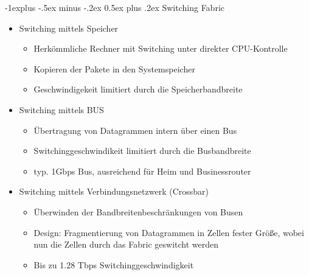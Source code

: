\documentclass[10pt,landscape]{article}
\makeatletter
\renewcommand{\subsection}{\@startsection{subsection}{2}{0mm}%
                                {-1explus -.5ex minus -.2ex}%
                                {0.5ex plus .2ex}%
                                {\normalfont\normalsize\bfseries}}
\makeatother
\begin{document}
\begin{multicols}{3}
\subsection{Switching Fabric}
\begin{itemize}
    \item Switching mittels Speicher
    \begin{itemize}
        \item Herkömmliche Rechner mit Switching unter direkter CPU-Kontrolle
        \item Kopieren der Pakete in den Systemspeicher
        \item Geschwindigekeit limitiert durch die Speicherbandbreite
    \end{itemize}
    \item Switching mittels BUS
    \begin{itemize}
        \item Übertragung von Datagrammen intern über einen Bus
        \item Switchinggeschwindikeit limitiert durch die Busbandbreite
        \item typ. 1Gbps Bus, ausreichend für Heim und Businessrouter
    \end{itemize}
    \item Switching mittels Verbindungsnetzwerk (Crossbar)
    \begin{itemize}
        \item Überwinden der Bandbreitenbeschränkungen von Busen
        \item Design: Fragmentierung von Datagrammen in Zellen fester Größe, wobei nun die Zellen durch das Fabric geswitcht werden
        \item Bis zu 1.28 Tbps Switchinggeschwindigkeit
    \end{itemize}
\end{itemize}


\end{multicols}
\end{document}
